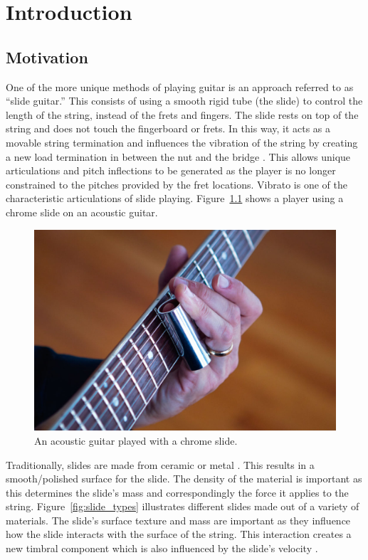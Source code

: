 \documentclass[../main.tex]{subfiles}
\begin{document}
\chapter{Introduction}
\section{Motivation}
One of the more unique methods of playing guitar is an approach referred to as “slide guitar.” This consists of using a smooth rigid tube (the slide) to control the length of the string, instead of the frets and fingers. The slide rests on top of the string and does not touch the fingerboard or frets. In this way, it acts as a movable string termination and influences the vibration of the string by creating a new load termination in between the nut and the bridge . This allows unique articulations and pitch inflections to be generated as the player is no longer constrained to the pitches provided by the fret locations. Vibrato is one of the characteristic articulations of slide playing. Figure~\ref{fig:acoustic_chrome} shows a player using a chrome slide on an acoustic guitar.

\begin{figure}[h]
    \centering
    \includegraphics[scale=.30]{./images/pictures/Slide-guitar-1024x683.jpg}
    \caption{An acoustic guitar played with a chrome slide.}
    \label{fig:acoustic_chrome}
\end{figure}

Traditionally, slides are made from ceramic or metal . This results in a smooth/polished surface for the slide. The density of the material is important as this determines the slide's mass and correspondingly the force it applies to the string. Figure~\ref{fig:slide_types} illustrates different slides made out of a variety of materials. The slide's surface texture and mass are important as they influence how the slide interacts with the surface of the string. This interaction creates a new timbral component which is also influenced by the slide’s velocity .
\end{document}
